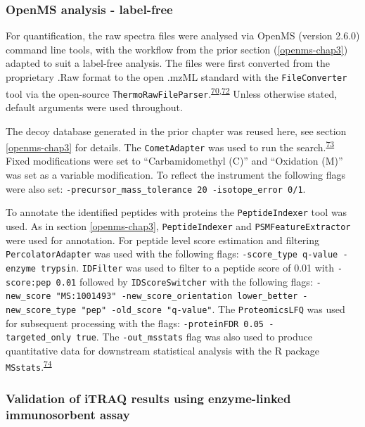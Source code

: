 \documentclass[
]{article}
\begin{document}
\hypertarget{openms-label-free}{%
\subsubsection{OpenMS analysis - label-free}\label{openms-label-free}}

For quantification, the raw spectra files were analysed via OpenMS (version 2.6.0) command line tools, with the workflow from the prior section (\ref{openms-chap3}) adapted to suit a label-free analysis.
The files were first converted from the proprietary .Raw format to the open .mzML standard with the \texttt{FileConverter} tool via the open-source \texttt{ThermoRawFileParser}.\textsuperscript{\protect\hyperlink{ref-rost_openms_2016}{70},\protect\hyperlink{ref-hulstaert_thermorawfileparser_2020}{72}}
Unless otherwise stated, default arguments were used throughout.

The decoy database generated in the prior chapter was reused here, see section \ref{openms-chap3} for details.
The \texttt{CometAdapter} was used to run the search.\textsuperscript{\protect\hyperlink{ref-eng_comet_2013}{73}}
Fixed modifications were set to ``Carbamidomethyl (C)'' and ``Oxidation (M)'' was set as a variable modification.
To reflect the instrument the following flags were also set: \texttt{-precursor\_mass\_tolerance\ 20\ -isotope\_error\ 0/1}.

To annotate the identified peptides with proteins the \texttt{PeptideIndexer} tool was used.
As in section \ref{openms-chap3}, \texttt{PeptideIndexer} and \texttt{PSMFeatureExtractor} were used for annotation.
For peptide level score estimation and filtering \texttt{PercolatorAdapter} was used with the following flags: \texttt{-score\_type\ q-value\ -enzyme\ trypsin}.
\texttt{IDFilter} was used to filter to a peptide score of 0.01 with \texttt{-score:pep\ 0.01} followed by \texttt{IDScoreSwitcher} with the following flags: \texttt{-new\_score\ "MS:1001493"\ -new\_score\_orientation\ lower\_better\ -new\_score\_type\ "pep"\ -old\_score\ "q-value"}.
The \texttt{ProteomicsLFQ} was used for subsequent processing with the flags: \texttt{-proteinFDR\ 0.05\ -targeted\_only\ true}.
The \texttt{-out\_msstats} flag was also used to produce quantitative data for downstream statistical analysis with the R package \texttt{MSstats}.\textsuperscript{\protect\hyperlink{ref-choi_msstats_2014}{74}}

\clearpage

\hypertarget{validation-of-itraq-results-using-enzyme-linked-immunosorbent-assay}{%
\subsubsection{Validation of iTRAQ results using enzyme-linked immunosorbent assay}\label{validation-of-itraq-results-using-enzyme-linked-immunosorbent-assay}}
\end{document}
